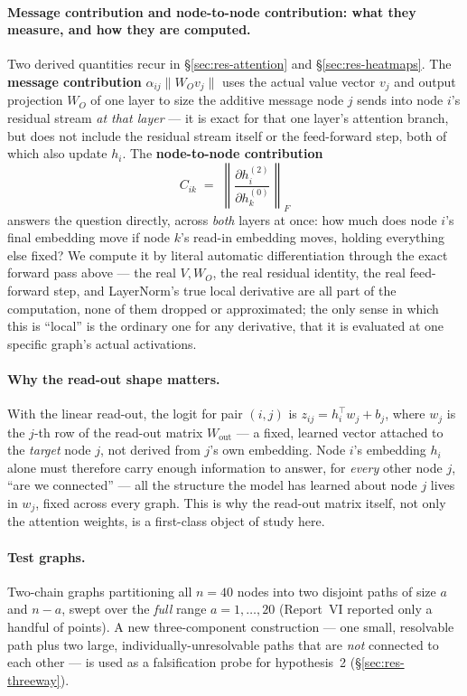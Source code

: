 \documentclass[11pt,a4paper]{article}
\begin{document}
\paragraph{Message contribution and node-to-node contribution: what they measure, and how they
are computed.} Two derived quantities recur in \S\ref{sec:res-attention} and
\S\ref{sec:res-heatmaps}. The \textbf{message contribution} $\alpha_{ij}\|W_O v_j\|$ uses the
actual value vector $v_j$ and output projection $W_O$ of one layer to size the additive message
node $j$ sends into node $i$'s residual stream \emph{at that layer} --- it is exact for that one
layer's attention branch, but does not include the residual stream itself or the feed-forward
step, both of which also update $h_i$. The \textbf{node-to-node contribution}
\[ C_{ik} \;=\; \left\|\frac{\partial h_i^{(2)}}{\partial h_k^{(0)}}\right\|_F \]
answers the question directly, across \emph{both} layers at once: how much does node $i$'s final
embedding move if node $k$'s read-in embedding moves, holding everything else fixed? We compute
it by literal automatic differentiation through the exact forward pass above --- the real
$V,W_O$, the real residual identity, the real feed-forward step, and LayerNorm's true local
derivative are all part of the computation, none of them dropped or approximated; the only sense
in which this is ``local'' is the ordinary one for any derivative, that it is evaluated at one
specific graph's actual activations.

\paragraph{Why the read-out shape matters.} With the linear read-out, the logit for
pair $(i,j)$ is $z_{ij} = h_i^\top w_j + b_j$, where $w_j$ is the $j$-th row of the
read-out matrix $W_{\mathrm{out}}$ --- a fixed, learned vector attached to the
\emph{target} node $j$, not derived from $j$'s own embedding. Node $i$'s embedding
$h_i$ alone must therefore carry enough information to answer, for \emph{every}
other node $j$, ``are we connected'' --- all the structure the model has learned
about node $j$ lives in $w_j$, fixed across every graph. This is why the read-out
matrix itself, not only the attention weights, is a first-class object of study
here.

\paragraph{Test graphs.} Two-chain graphs partitioning all $n=40$ nodes into two
disjoint paths of size $a$ and $n-a$, swept over the \emph{full} range $a=1,\dots,20$
(Report~VI reported only a handful of points). A new three-component construction
--- one small, resolvable path plus two large, individually-unresolvable paths that
are \emph{not} connected to each other --- is used as a falsification probe for
hypothesis~2 (\S\ref{sec:res-threeway}).
\end{document}
